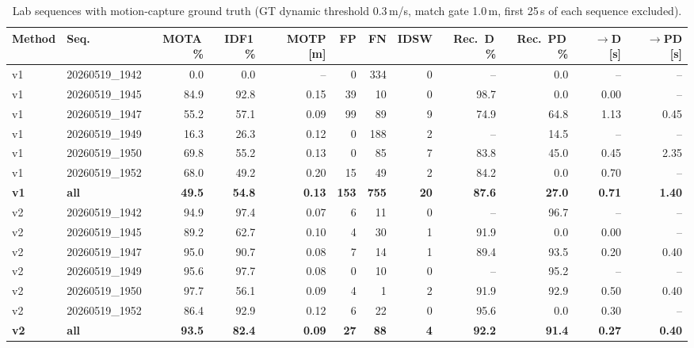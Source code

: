 \begin{table}[t]
\centering
\caption{Lab sequences with motion-capture ground truth (GT dynamic threshold 0.3\,m/s, match gate 1.0\,m, first 25\,s of each sequence excluded).}
\label{tab:own_mocap_after25s}
\setlength{\tabcolsep}{3pt}
\begin{tabular}{llrrrrrrrrrr}
\toprule
Method & Seq. & MOTA\,\% & IDF1\,\% & MOTP [m] & FP & FN & IDSW & Rec.\ D\,\% & Rec.\ PD\,\% & $\to$D [s] & $\to$PD [s] \\
\midrule
v1 & 20260519\_1942 & 0.0 & 0.0 & -- & 0 & 334 & 0 & -- & 0.0 & -- & -- \\
v1 & 20260519\_1945 & 84.9 & 92.8 & 0.15 & 39 & 10 & 0 & 98.7 & 0.0 & 0.00 & -- \\
v1 & 20260519\_1947 & 55.2 & 57.1 & 0.09 & 99 & 89 & 9 & 74.9 & 64.8 & 1.13 & 0.45 \\
v1 & 20260519\_1949 & 16.3 & 26.3 & 0.12 & 0 & 188 & 2 & -- & 14.5 & -- & -- \\
v1 & 20260519\_1950 & 69.8 & 55.2 & 0.13 & 0 & 85 & 7 & 83.8 & 45.0 & 0.45 & 2.35 \\
v1 & 20260519\_1952 & 68.0 & 49.2 & 0.20 & 15 & 49 & 2 & 84.2 & 0.0 & 0.70 & -- \\
\textbf{v1} & \textbf{all} & \textbf{49.5} & \textbf{54.8} & \textbf{0.13} & \textbf{153} & \textbf{755} & \textbf{20} & \textbf{87.6} & \textbf{27.0} & \textbf{0.71} & \textbf{1.40} \\
\midrule
v2 & 20260519\_1942 & 94.9 & 97.4 & 0.07 & 6 & 11 & 0 & -- & 96.7 & -- & -- \\
v2 & 20260519\_1945 & 89.2 & 62.7 & 0.10 & 4 & 30 & 1 & 91.9 & 0.0 & 0.00 & -- \\
v2 & 20260519\_1947 & 95.0 & 90.7 & 0.08 & 7 & 14 & 1 & 89.4 & 93.5 & 0.20 & 0.40 \\
v2 & 20260519\_1949 & 95.6 & 97.7 & 0.08 & 0 & 10 & 0 & -- & 95.2 & -- & -- \\
v2 & 20260519\_1950 & 97.7 & 56.1 & 0.09 & 4 & 1 & 2 & 91.9 & 92.9 & 0.50 & 0.40 \\
v2 & 20260519\_1952 & 86.4 & 92.9 & 0.12 & 6 & 22 & 0 & 95.6 & 0.0 & 0.30 & -- \\
\textbf{v2} & \textbf{all} & \textbf{93.5} & \textbf{82.4} & \textbf{0.09} & \textbf{27} & \textbf{88} & \textbf{4} & \textbf{92.2} & \textbf{91.4} & \textbf{0.27} & \textbf{0.40} \\
\bottomrule
\end{tabular}
\end{table}
